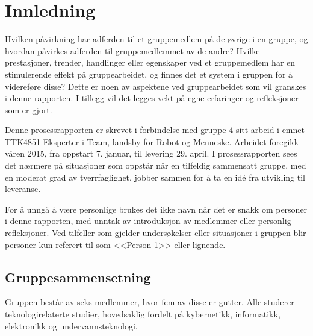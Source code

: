 
\chapter{Innledning} %

\label{ch:innledning} %




Hvilken påvirkning har adferden til et gruppemedlem på de øvrige i en gruppe, og hvordan påvirkes adferden til gruppemedlemmet av de andre? Hvilke prestasjoner, trender, handlinger eller egenskaper ved et gruppemedlem har en stimulerende effekt på gruppearbeidet, og finnes det et system i gruppen for å videreføre disse? Dette er noen av aspektene ved gruppearbeidet som vil granskes i denne rapporten. I tillegg vil det legges vekt på egne erfaringer og refleksjoner som er gjort.  

Denne prosessrapporten er skrevet i forbindelse med gruppe 4 sitt arbeid i emnet TTK4851 Eksperter i Team, landsby for Robot og Menneske. Arbeidet foregikk våren 2015, fra oppstart 7. januar, til levering 29. april. I prosessrapporten sees det nærmere på situasjoner som oppstår når en tilfeldig sammensatt gruppe, med en moderat grad av tverrfaglighet, jobber sammen for å ta en idé fra utvikling til leveranse. 

For å unngå å være personlige brukes det ikke navn når det er snakk om personer i denne rapporten, med unntak av introduksjon av medlemmer eller personlig refleksjoner. Ved tilfeller som gjelder undersøkelser eller situasjoner i gruppen blir personer kun referert til som <<Person 1>> eller lignende. 

\section{Gruppesammensetning}

Gruppen består av seks medlemmer, hvor fem av disse er gutter. Alle studerer teknologirelaterte studier, hovedsaklig fordelt på kyberne\-tikk, informatikk, elektronikk og undervannsteknologi. 

